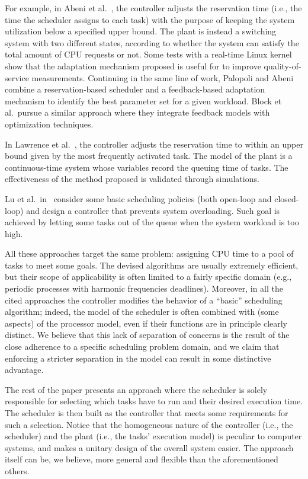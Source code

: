 \documentclass[a4paper]{article}
\begin{document}
For example, in Abeni et al.~\cite{AbeniEtAl-2002a}, the controller
adjusts the reservation time (i.e., the time the scheduler assigns to
each task) with the purpose of keeping the system utilization below a
specified upper bound. The plant is instead a switching
system with two different states, according to whether the system can satisfy 
the total amount of CPU requests or not.
Some tests with a real-time Linux kernel show that the adaptation
mechanism proposed is useful for to improve quality-of-service measurements. Continuing
in the same line of work, Palopoli and Abeni~\cite{PalopoliAbeni-2009a} combine
a reservation-based scheduler and a feedback-based adaptation mechanism to
identify the best parameter set for a given workload.
Block et al.~pursue a similar approach \cite{BlockEtAl-2008} where they integrate feedback models with optimization techniques.

In Lawrence et al.~\cite{LawrenceEtAl-2001a}, the controller adjusts the 
reservation time to within an upper bound given by the most frequently 
activated task. The model of the plant is a continuous-time system whose 
variables record the queuing time of tasks.
The effectiveness of the method proposed is validated through simulations.

Lu et al.\ in~\cite{LuEtAl-2002a} consider some basic scheduling policies 
(both open-loop and closed-loop) and design a controller that prevents system 
overloading. Such goal is achieved by letting some tasks out of the queue when 
the system workload is too high.

All these approaches target the same problem: assigning CPU time to a pool of 
tasks to meet some goals. The devised algorithms are usually extremely 
efficient, but their scope of applicability is often limited to a fairly 
specific domain (e.g., periodic processes with harmonic frequencies deadlines).
Moreover, in all the cited approaches the controller modifies the behavior of 
a ``basic'' scheduling algorithm; indeed, the model of the scheduler is often 
combined with (some aspects) of the processor model, even if their functions 
are in principle clearly distinct.
We believe that this lack of separation of concerns is the result of the 
close adherence to a specific scheduling problem domain, and we claim that 
enforcing a stricter separation in the model can result in some distinctive 
advantage.

The rest of the paper presents an approach where the scheduler is solely
responsible for selecting which tasks have to run and their desired execution time.
The scheduler is then built as the controller that meets some requirements for
such a selection. Notice that the homogeneous nature of the controller (i.e., 
the scheduler) and the plant (i.e., the tasks' execution model) is peculiar to 
computer systems, and makes a unitary design of the overall system easier.
The approach itself can be, we believe, more general and flexible than the 
aforementioned others.
\end{document}
